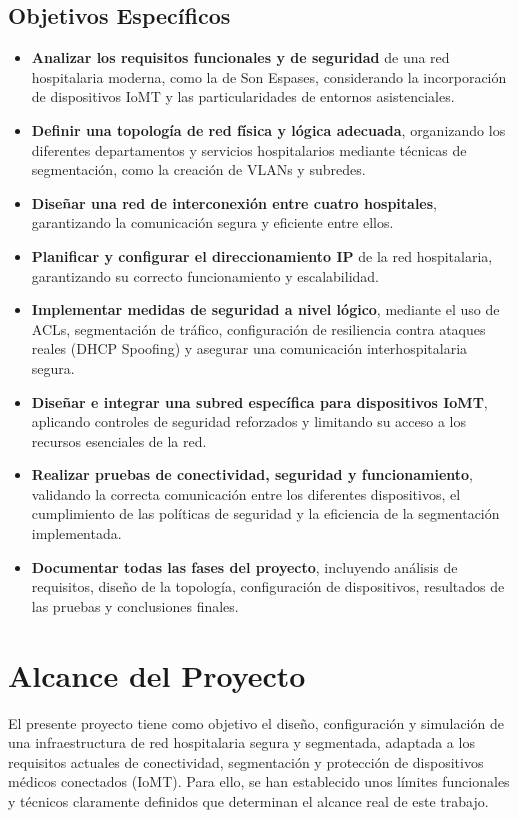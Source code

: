 \subsection{Objetivos Específicos}
\begin{itemize}
    \item \textbf{Analizar los requisitos funcionales y de seguridad} de una red hospitalaria moderna, como la de Son Espases, considerando la incorporación de dispositivos IoMT y las 
    particularidades de entornos asistenciales.
    \item \textbf{Definir una topología de red física y lógica adecuada}, organizando los diferentes departamentos y servicios hospitalarios mediante técnicas de 
    segmentación, como la creación de VLANs y subredes.
    \item \textbf{Diseñar una red de interconexión entre cuatro hospitales}, garantizando la comunicación segura y eficiente entre ellos.
    \item \textbf{Planificar y configurar el direccionamiento \ac{IP}} de la red hospitalaria, garantizando su correcto funcionamiento y escalabilidad.
    \item \textbf{Implementar medidas de seguridad a nivel lógico}, mediante el uso de \ac{ACL}s, segmentación de tráfico, configuración de resiliencia contra ataques reales (DHCP Spoofing) 
    y asegurar una comunicación interhospitalaria segura.
    \item \textbf{Diseñar e integrar una subred específica para dispositivos IoMT}, aplicando controles de seguridad reforzados y limitando su acceso a los recursos esenciales de la red.
    \item \textbf{Realizar pruebas de conectividad, seguridad y funcionamiento}, validando la correcta comunicación entre los diferentes dispositivos, el cumplimiento de las políticas de 
    seguridad y la eficiencia de la segmentación implementada.
    \item \textbf{Documentar todas las fases del proyecto}, incluyendo análisis de requisitos, diseño de la topología, configuración de dispositivos, resultados de las pruebas y conclusiones 
    finales.
\end{itemize}

\section{Alcance del Proyecto}
El presente proyecto tiene como objetivo el diseño, configuración y simulación de una infraestructura de red hospitalaria segura y segmentada, adaptada a los requisitos 
actuales de conectividad, segmentación y protección de dispositivos médicos conectados (IoMT). Para ello, se han establecido unos límites funcionales y técnicos claramente 
definidos que determinan el alcance real de este trabajo.

